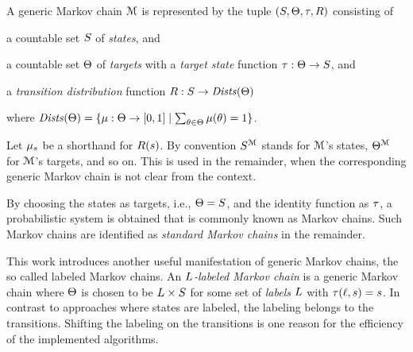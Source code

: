 \begin{definition} A generic Markov chain $\mathcal{M}$ is represented by the tuple $(S, \Theta, \tau, R)$ consisting of
\label{def:mc}
\begin{compactitem}
\item a countable set $S$ of \emph{states}, and
\item a countable set $\Theta$ of \emph{targets} with a \emph{target state} function $\tau : \Theta \to S$, and
\item a \emph{transition distribution} function $R : S \to \mathit{Dists}(\Theta)$
\end{compactitem}
where $\mathit{Dists}(\Theta) = \{ \mu : \Theta \to [0,1] \mid \sum_{\theta \in \Theta} \mu(\theta) = 1 \}$.
\end{definition}
Let $\mu_{s}$ be a shorthand for $R(s)$.
By convention $S^{\mathcal{M}}$ stands for $\mathcal{M}$'s states, $\Theta^{\mathcal{M}}$ for $\mathcal{M}$'s targets, and so on.
This is used in the remainder, when the corresponding generic Markov chain is not clear from the context.


By choosing the states as targets, i.e., $\Theta = S$, and the identity function as $\tau$, a probabilistic system is obtained that is commonly known as Markov chains.
Such Markov chains are identified as \emph{standard Markov chains} in the remainder.

This work introduces another useful manifestation of generic Markov chains, the so called labeled Markov chains.
An \emph{$L$-labeled Markov chain} is a generic Markov chain where $\Theta$ is chosen to be $L \times S$ for some set of \emph{labels} $L$ with $\tau(\ell, s) = s$.
In contrast to approaches where states are labeled, the labeling belongs to the transitions.
Shifting the labeling on the transitions is one reason for the efficiency of the implemented algorithms.

